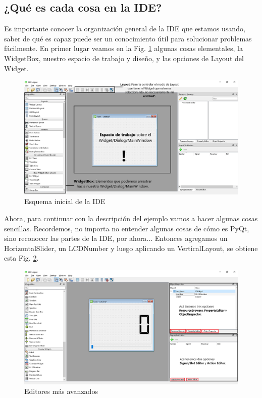 \subsection{¿Qu\'e es cada cosa en la IDE?}
Es importante conocer la organizaci\'on general de la IDE que estamos usando, saber de qu\'e es capaz puede ser un conocimiento
\'util para solucionar problemas f\'acilmente. En primer lugar veamos en la Fig. \ref{fig:qt_ide_0} algunas cosas elementales, la WidgetBox,
nuestro espacio de trabajo y dise\~no, y las opciones de Layout del Widget.

\begin{figure}[H]
    \centering
    \includegraphics[scale=0.44]{imagenes/qtdesigner/qt_ide_0.png}
    \caption{Esquema inicial de la IDE}
    \label{fig:qt_ide_0}
\end{figure}

Ahora, para continuar con la descripci\'on del ejemplo vamos a hacer algunas cosas sencillas. Recordemos,
no importa no entender algunas cosas de c\'omo es PyQt, sino reconocer las partes de la IDE, por ahora...
Entonces agregamos un HorizontalSlider, un LCDNumber y luego aplicando un VerticalLayout, se obtiene esta Fig. \ref{fig:qt_ide_1}.

\begin{figure}[H]
    \centering
    \includegraphics[scale=0.44]{imagenes/qtdesigner/qt_ide_1.png}
    \caption{Editores m\'as avanzados}
    \label{fig:qt_ide_1}
\end{figure}

